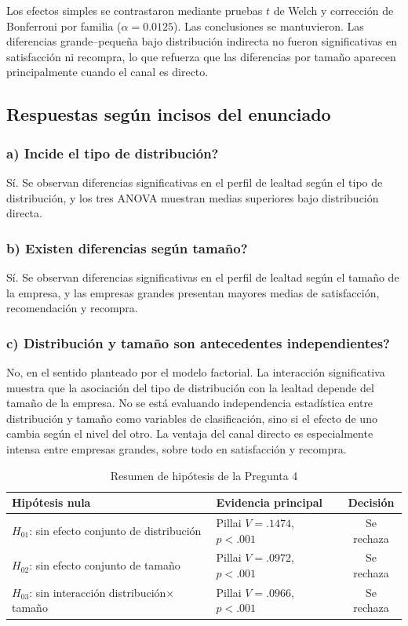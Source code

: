 \documentclass[12pt,letterpaper]{article}
\begin{document}
Los efectos simples se contrastaron mediante pruebas $t$ de Welch y corrección de Bonferroni por familia ($\alpha=0.0125$). Las conclusiones se mantuvieron. Las diferencias grande--pequeña bajo distribución indirecta no fueron significativas en satisfacción ni recompra, lo que refuerza que las diferencias por tamaño aparecen principalmente cuando el canal es directo.

\subsection{Respuestas según incisos del enunciado}

\subsubsection{a) \textquestiondown{}Incide el tipo de distribución?}

Sí. Se observan diferencias significativas en el perfil de lealtad según el tipo de distribución, y los tres ANOVA muestran medias superiores bajo distribución directa.

\subsubsection{b) \textquestiondown{}Existen diferencias según tamaño?}

Sí. Se observan diferencias significativas en el perfil de lealtad según el tamaño de la empresa, y las empresas grandes presentan mayores medias de satisfacción, recomendación y recompra.

\subsubsection{c) \textquestiondown{}Distribución y tamaño son antecedentes independientes?}

No, en el sentido planteado por el modelo factorial. La interacción significativa muestra que la asociación del tipo de distribución con la lealtad depende del tamaño de la empresa. No se está evaluando independencia estadística entre distribución y tamaño como variables de clasificación, sino si el efecto de uno cambia según el nivel del otro. La ventaja del canal directo es especialmente intensa entre empresas grandes, sobre todo en satisfacción y recompra.

\begin{table}[H]
\centering
\caption{Resumen de hipótesis de la Pregunta 4}
\label{tab:p4-hipotesis}
\begin{tabular}{llc}
\toprule
Hipótesis nula & Evidencia principal & Decisión \\
\midrule
$H_{01}$: sin efecto conjunto de distribución & Pillai $V=.1474$, $p<.001$ & Se rechaza \\
$H_{02}$: sin efecto conjunto de tamaño & Pillai $V=.0972$, $p<.001$ & Se rechaza \\
$H_{03}$: sin interacción distribución$\times$tamaño & Pillai $V=.0966$, $p<.001$ & Se rechaza \\
\bottomrule
\end{tabular}
\end{table}
\end{document}
